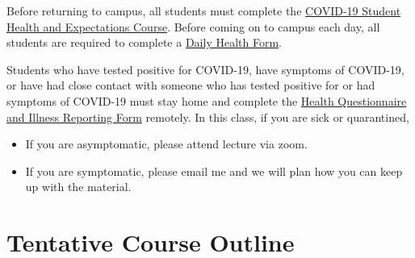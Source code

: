 \documentclass[12pt]{article}
\begin{document}
Before returning to campus, all students must complete the \href{https://www.colorado.edu/protect-our-herd/how#anchor1}{COVID-19 Student Health and Expectations Course}. Before coming on to campus each day, all students are required to complete a \href{https://www.colorado.edu/protect-our-herd/daily-health-form}{Daily Health Form}. 

Students who have tested positive for COVID-19, have symptoms of COVID-19, or have had close contact with someone who has tested positive for or had symptoms of COVID-19 must stay home and complete the \href{https://www.colorado.edu/protect-our-herd/daily-health-form}{Health Questionnaire and Illness Reporting Form} remotely. In this class, if you are sick or quarantined,

\begin{itemize}
	\item If you are asymptomatic, please attend lecture via zoom.
	
	\item If you are symptomatic, please email me and we will plan how you can keep up with the material.
\end{itemize}



\newpage
\section*{Tentative Course Outline}
\end{document}
